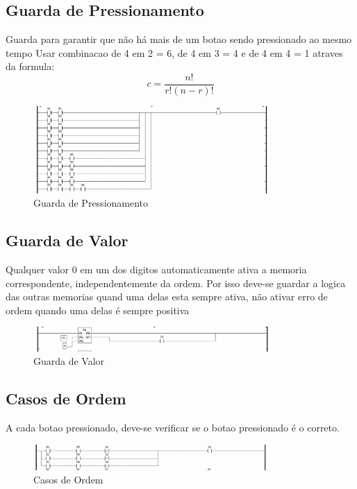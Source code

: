 \subsection{Guarda de Pressionamento}
Guarda para garantir que não há mais de um botao sendo pressionado ao mesmo tempo
Usar combinacao de 4 em 2 = 6, de 4 em 3 = 4 e de 4 em 4 = 1 atraves da formula:
\begin{equation}
  c = \frac{n!}{r!(n-r)!}
\end{equation}

\begin{figure}[H]
    \centering
    \includegraphics[width=0.8\textwidth]{images/button_guard.png}
    \caption{Guarda de Pressionamento}
    \label{fig:guarda_de_pressionamento}
\end{figure}

\subsection{Guarda de Valor}
Qualquer valor 0 em um dos digitos automaticamente ativa a memoria correspondente, independentemente da ordem. Por isso deve-se guardar a logica das outras memorias quand uma delas esta sempre ativa, não ativar erro de ordem quando uma delas é sempre positiva

\begin{figure}[H]
    \centering
    \includegraphics[width=0.8\textwidth]{images/button_value_guard.png}
    \caption{Guarda de Valor}
    \label{fig:guarda_de_valor}
\end{figure}

\subsection{Casos de Ordem}
A cada botao pressionado, deve-se verificar se o botao pressionado é o correto.

\begin{figure}[H]
    \centering
    \includegraphics[width=0.8\textwidth]{images/button_order_case.png}
    \caption{Casos de Ordem}
    \label{fig:casos_de_ordem}
\end{figure}

